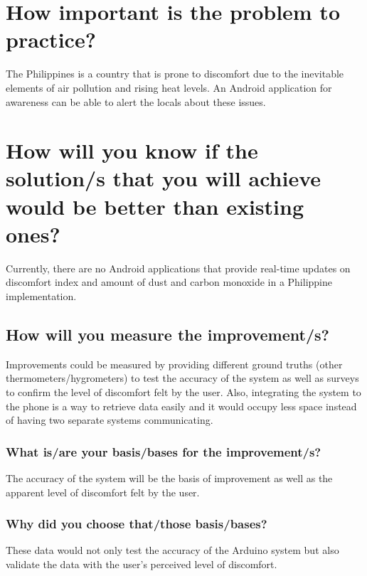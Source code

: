 


\section{How important is the problem to practice?}

The Philippines is a country that is prone to discomfort due to the inevitable elements of air pollution and rising heat levels. An Android application for awareness can be able to alert the locals about these issues.	
	
\section{How will you know if the solution/s that you will achieve would be better than existing ones?}	

Currently, there are no Android applications that provide real-time updates on discomfort index and amount of dust and carbon monoxide in a Philippine implementation.

\subsection{How will you measure the improvement/s?}	

Improvements could be measured by providing different ground truths (other thermometers/hygrometers) to test the accuracy of the system as well as surveys to confirm the level of discomfort felt by the user. Also, integrating the system to the phone is a way to retrieve data easily and it would occupy less space instead of having two separate systems communicating.
	
\subsubsection{What is/are your basis/bases for the improvement/s?}

The accuracy of the system will be the basis of improvement as well as the apparent level of discomfort felt by the user.
		
\subsubsection{Why did you choose that/those basis/bases?}

These data would not only test the accuracy of the Arduino system but also validate the data with the user's perceived level of discomfort.
				
